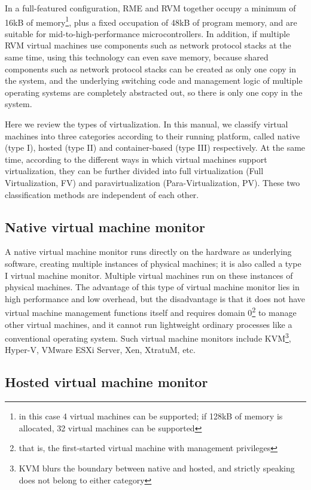 In a full-featured configuration, RME and RVM together occupy a minimum of 16kB of memory\footnote{in this case 4 virtual machines can be supported; if 128kB of memory is allocated, 32 virtual machines can be supported}, plus a fixed occupation of 48kB of program memory, and are suitable for mid-to-high-performance microcontrollers. In addition, if multiple RVM virtual machines use components such as network protocol stacks at the same time, using this technology can even save memory, because shared components such as network protocol stacks can be created as only one copy in the system, and the underlying switching code and management logic of multiple operating systems are completely abstracted out, so there is only one copy in the system.

Here we review the types of virtualization. In this manual, we classify virtual machines into three categories according to their running platform, called native (type I), hosted (type II) and container-based (type III) respectively. At the same time, according to the different ways in which virtual machines support virtualization, they can be further divided into full
virtualization (Full
Virtualization, FV) and paravirtualization (Para-Virtualization, PV). These two classification methods are independent of each other.

\subsection{Native virtual machine monitor}\label{subsec:1-2-1}

A native virtual machine monitor runs directly on the hardware as underlying software, creating multiple instances of physical machines; it is also called a type I virtual machine monitor. Multiple virtual machines run on these instances of physical machines. The advantage of this type of virtual machine monitor lies in high performance and low overhead, but the disadvantage is that it does not have virtual machine management functions itself and requires domain 0\footnote{that is, the first-started virtual machine with management privileges} to manage other virtual machines, and it cannot run lightweight ordinary processes like a conventional operating system. Such virtual machine monitors include KVM\footnote{KVM blurs the boundary between native and hosted, and strictly speaking does not belong to either category}, Hyper-V, VMware ESXi Server, Xen, XtratuM, etc.

\subsection{Hosted virtual machine monitor}\label{subsec:1-2-2}

